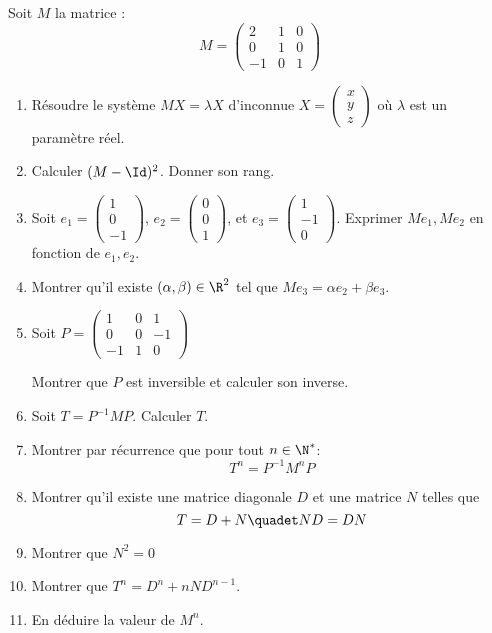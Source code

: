 


\begin{exercice}
Soit $M$ la matrice : 
$$M=\left( \begin{array}{ccc}
2 &1& 0\\
0 &1 & 0  \\
 -1&0&1
\end{array}\right) $$

\begin{enumerate}
\item  Résoudre le système $MX=\lambda X$ d'inconnue $X =\left(
\begin{array}{c}
x\\
y\\
z
\end{array}
 \right)$ où $\lambda$ est un paramètre réel. 
\item Calculer $(M- \Id)^2$. Donner son rang.

 \item Soit $e_1= \left(
\begin{array}{c}
1\\
0\\
-1
\end{array}
 \right)$,  $e_2= \left(
\begin{array}{c}
0\\
0\\
1
\end{array}
 \right)$, et  $e_3= \left(
\begin{array}{c}
1\\
-1\\
0
\end{array}
 \right)$.
Exprimer  $Me_1, Me_2$ en fonction de $e_1, e_2$.
\item Montrer qu'il existe $(\alpha, \beta)\in \R^2$ tel que $M e_3 = \alpha e_2 +\beta e_3$.
 
\item Soit $P= \left(
\begin{array}{ccc}
1&0&1\\
0&0&-1\\
-1&1&0
\end{array}
 \right)$ 
 
 Montrer que $P$ est inversible et calculer son inverse. 
 \item Soit $T=P^{-1}MP$. Calculer $T$. 
 \item Montrer par récurrence que pour tout $n\in \N^*$: 
 $$T^n = P^{-1}M^n P$$
 \item Montrer qu'il existe une matrice diagonale $D$ et une matrice $N$ telles que 
 $$T =D+N \quadet ND=DN$$
\item Montrer que $N^2=0$
\item Montrer   que $T^n = D^n +nND^{n-1}$.
\item En déduire la valeur de $M^n$.
\end{enumerate}
\end{exercice}

